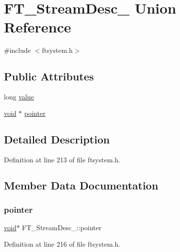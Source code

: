 \hypertarget{union_f_t___stream_desc__}{}\section{F\+T\+\_\+\+Stream\+Desc\+\_\+ Union Reference}
\label{union_f_t___stream_desc__}


{\ttfamily \#include $<$ftsystem.\+h$>$}

\subsection*{Public Attributes}
\begin{DoxyCompactItemize}
\item 
long \mbox{\hyperlink{union_f_t___stream_desc___a1a94493032faef1c3ed7bc33816ce90c}{value}}
\item 
\mbox{\hyperlink{_s_d_l__opengles2__gl2ext_8h_ae5d8fa23ad07c48bb609509eae494c95}{void}} $\ast$ \mbox{\hyperlink{union_f_t___stream_desc___a410ed102dc377fb9a5b9c950c3f863dc}{pointer}}
\end{DoxyCompactItemize}


\subsection{Detailed Description}


Definition at line 213 of file ftsystem.\+h.



\subsection{Member Data Documentation}
\mbox{\label{union_f_t___stream_desc___a410ed102dc377fb9a5b9c950c3f863dc}} 
\subsubsection{\texorpdfstring{pointer}{pointer}}
{\footnotesize\ttfamily \mbox{\hyperlink{_s_d_l__opengles2__gl2ext_8h_ae5d8fa23ad07c48bb609509eae494c95}{void}}$\ast$ F\+T\+\_\+\+Stream\+Desc\+\_\+\+::pointer}



Definition at line 216 of file ftsystem.\+h.

\mbox{\label{union_f_t___stream_desc___a1a94493032faef1c3ed7bc33816ce90c}} 
